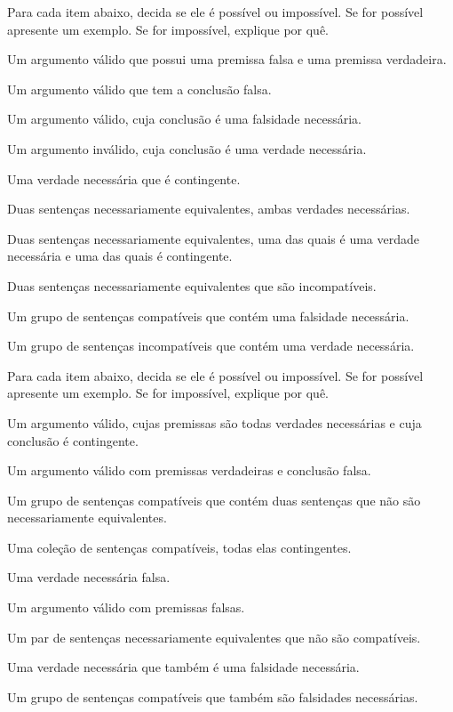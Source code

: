 \problempart
\label{pr.EnglishCombinations2}
Para cada item abaixo, decida se ele é possível ou impossível.
Se for possível apresente um exemplo.
Se for impossível, explique por quê.
\begin{earg}
\item Um argumento válido que possui uma premissa falsa e uma premissa verdadeira.

\item Um argumento válido que tem a conclusão falsa.

\item Um argumento válido, cuja conclusão é uma falsidade necessária.

\item Um argumento inválido, cuja conclusão é uma verdade necessária.

\item Uma verdade necessária que é contingente.

\item Duas sentenças necessariamente equivalentes, ambas verdades necessárias.

\item Duas sentenças necessariamente equivalentes, uma das quais é uma verdade necessária e uma das quais é contingente.

\item Duas sentenças necessariamente equivalentes que são incompatíveis.

\item Um grupo de sentenças compatíveis que contém uma falsidade necessária.

\item Um grupo de sentenças incompatíveis que contém uma verdade necessária.
\end{earg}


\problempart
Para cada item abaixo, decida se ele é possível ou impossível.
Se for possível apresente um exemplo.
Se for impossível, explique por quê.
\begin{earg}
\item Um argumento válido, cujas premissas são todas verdades necessárias e cuja conclusão é contingente.
\item Um argumento válido com premissas verdadeiras e conclusão falsa.
\item Um grupo de sentenças compatíveis que contém duas sentenças que não são necessariamente equivalentes.
\item Uma coleção de sentenças compatíveis, todas elas contingentes.
\item Uma verdade necessária falsa.
\item Um argumento válido com premissas falsas.
\item Um par de sentenças necessariamente equivalentes que não são compatíveis.
\item Uma verdade necessária que também é uma falsidade necessária.
\item Um grupo de sentenças compatíveis que também são falsidades necessárias.
\end{earg}

